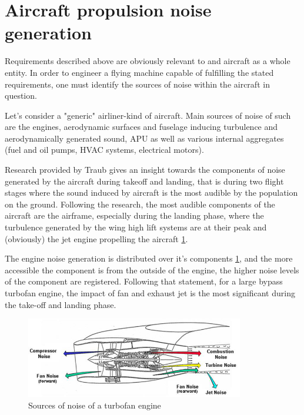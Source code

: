 \section{Aircraft propulsion noise generation}

Requirements described above are obviously relevant to and aircraft as a whole entity. In order to engineer a flying machine capable of fulfilling the stated requirements, one must identify the sources of noise within the aircraft in question.

Let's consider a "generic" airliner-kind of aircraft. Main sources of noise of such are the engines, aerodynamic surfaces and fuselage inducing turbulence and aerodynamically generated sound, APU as well as various internal aggregates (fuel and oil pumps, HVAC systems, electrical motors). 

Research provided by Traub \citep{traub} gives an insight towards the components of noise generated by the aircraft during takeoff and landing, that is during two flight stages where the sound induced by aircraft is the most audible by the population on the ground. Following the research, the most audible components of the aircraft are the airframe, especially during the landing phase, where the turbulence generated by the wing high lift systems are at their peak and (obviously) the jet engine propelling the aircraft \ref{traub1}.

The engine noise generation is distributed over it's components \ref{traub1}, and the more accessible the component is from the outside of the engine, the higher noise levels of the component are registered. Following that statement, for a large bypass turbofan engine, the impact of fan and exhaust jet is the most significant during the take-off and landing phase.

\begin{figure}[h!]
\centering %
\includegraphics[width=0.85\textwidth]{Pictures/traub1.png}
\caption{Sources of noise of a turbofan engine \citep{traub}}
\label{traub1}
\end{figure}

